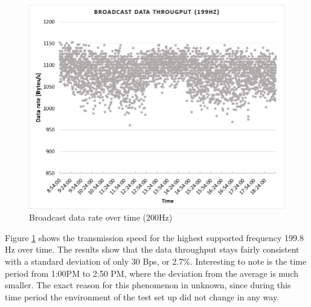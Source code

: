 \begin{description}
	\begin{figure}[H]
		\centering
		\includegraphics[scale=0.5]{content/images/exp1_long.png}
		\caption{Broadcast data rate over time (200Hz)}\label{fig:exp1long}
	\end{figure}
	Figure \ref{fig:exp1long} shows the transmission speed for the highest supported frequency 199.8 Hz over time. The results show that the data throughput stays fairly consistent with a standard deviation of only 30 Bps, or 2.7\%. Interesting to note is the time period from 1:00PM to 2:50 PM, where the deviation from the average is much smaller. The exact reason for this phenomenon in unknown, since during this time period the environment of the test set up did not change in any way.
\end{description}
\newpage

